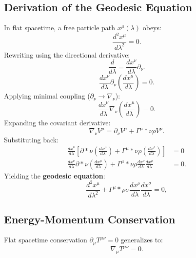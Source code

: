 \documentclass[11pt, a4paper]{report}
\begin{document}
\subsection*{Derivation of the Geodesic Equation}
In flat spacetime, a free particle path $x^\mu(\lambda)$ obeys:
\begin{equation}
\label{eq:flat_motion}
\frac{d^{2}x^{\mu}}{d\lambda^{2}} = 0.
\end{equation}
Rewriting using the directional derivative:
\begin{equation}
\frac{d}{d\lambda} = \frac{dx^{\nu}}{d\lambda}\partial_{\nu}.
\end{equation}
\begin{equation}
\label{eq:flat_motion_chain}
\frac{dx^{\nu}}{d\lambda}\partial_{\nu}\left(\frac{dx^{\mu}}{d\lambda}\right) = 0.
\end{equation}
Applying minimal coupling ($\partial_{\nu} \rightarrow \nabla_{\nu}$):
\begin{equation}
\frac{dx^{\nu}}{d\lambda}\nabla_{\nu}\left(\frac{dx^{\mu}}{d\lambda}\right) = 0.
\end{equation}
Expanding the covariant derivative:
\begin{equation}
\nabla_{\nu} V^{\mu} = \partial_{\nu} V^{\mu} + \Gamma^{\mu}*{\nu\rho} V^{\rho}.
\end{equation}
Substituting back:
\begin{align}
\frac{dx^{\nu}}{d\lambda} \left[ \partial*{\nu}\left(\frac{dx^{\mu}}{d\lambda}\right) + \Gamma^{\mu}*{\nu\rho}\left(\frac{dx^{\rho}}{d\lambda}\right) \right] &= 0 \nonumber \\
\frac{dx^{\nu}}{d\lambda} \partial*{\nu}\left(\frac{dx^{\mu}}{d\lambda}\right) + \Gamma^{\mu}*{\nu\rho}\frac{dx^{\nu}}{d\lambda}\frac{dx^{\rho}}{d\lambda} &= 0.
\end{align}
Yielding the \textbf{geodesic equation}:
\begin{equation}
\label{eq:geodesic_derivation}
\frac{d^{2}x^{\mu}}{d\lambda^{2}} + \Gamma^{\mu}*{\rho\sigma}\frac{dx^{\rho}}{d\lambda}\frac{dx^{\sigma}}{d\lambda} = 0,
\end{equation}

\subsection*{Energy-Momentum Conservation}
Flat spacetime conservation $\partial_{\mu}T^{\mu\nu} = 0$ generalizes to:
\begin{equation}
\nabla_{\mu}T^{\mu\nu} = 0.
\end{equation}
\end{document}
